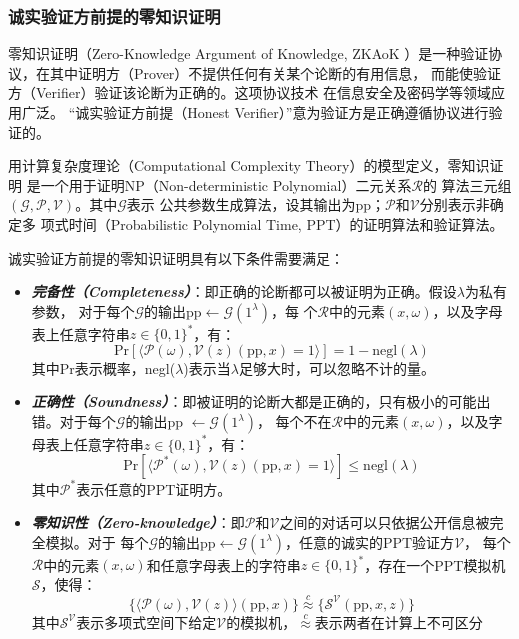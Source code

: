 \documentclass[zihao=-4]{ctexart}
\begin{document}
\begin{spacing}{1.5}
\subsubsection{诚实验证方前提的零知识证明}
零知识证明（Zero-Knowledge Argument of Knowledge, ZKAoK
）是一种验证协议，在其中证明方（Prover）不提供任何有关某个论断的有用信息，
而能使验证方（Verifier）验证该论断为正确的。这项协议技术
在信息安全及密码学等领域应用广泛。
“诚实验证方前提（Honest Verifier）”意为验证方是正确遵循协议进行验证的。\par
用计算复杂度理论（Computational Complexity Theory）的模型定义，零知识证明
是一个用于证明NP（Non-deterministic Polynomial）二元关系$\mathcal{R}$的
算法三元组$(\mathcal{G}, \mathcal{P}, \mathcal{V})$。其中$\mathcal{G}$表示
公共参数生成算法，设其输出为pp；$\mathcal{P}$和$\mathcal{V}$分别表示非确定多
项式时间（Probabilistic Polynomial Time, PPT）的证明算法和验证算法。\par
诚实验证方前提的零知识证明\cite{Fourty-two}具有以下条件需要满足：
\begin{itemize}
  \item \textbf{\emph{完备性（Completeness）}}：即正确的论断都可以被证明为正确。假设$\lambda$为私有参数，
      对于每个$\mathcal{G}$的输出pp$\leftarrow\mathcal{G}(1^{\lambda})$，每
      个$\mathcal{R}$中的元素$(x,\omega)$，以及字母表上任意字符串$z\in\{0,1\}^*$，有：
      \[\text{Pr}[\langle \mathcal{P}({\omega}),\mathcal{V}(z)(\text{pp},x)=1\rangle]=1-\text{negl}(\lambda)\]
      其中Pr表示概率，negl($\lambda$)表示当$\lambda$足够大时，可以忽略不计的量。
  \item \textbf{\emph{正确性（Soundness）}}：即被证明的论断大都是正确的，只有极小的可能出错。对于每个$\mathcal{G}$的输出pp
      $\leftarrow\mathcal{G}(1^{\lambda})$，
      每个不在$\mathcal{R}$中的元素$(x,\omega)$，以及字母表上任意字符串$z\in\{0,1\}^*$，有：
      \[\text{Pr}[\langle \mathcal{P}^*({\omega}),\mathcal{V}(z)(\text{pp},x)=1\rangle]\le\text{negl}(\lambda)\]
      其中$\mathcal{P}^*$表示任意的PPT证明方。
  \item \textbf{\emph{零知识性（Zero-knowledge）}}：即$\mathcal{P}$和$\mathcal{V}$之间的对话可以只依据公开信息被完全模拟。对于
      每个$\mathcal{G}$的输出pp$\leftarrow\mathcal{G}(1^{\lambda})$，任意的诚实的PPT验证方$\mathcal{V}$，
      每个$\mathcal{R}$中的元素$(x,\omega)$和任意字母表上的字符串$z\in\{0,1\}^*$，存在一个PPT模拟机$\mathcal{S}$，使得：
      \[\{\langle \mathcal{P}(\omega),\mathcal{V}(z)\rangle(\text{pp},x)\}\overset{c}{\approx}\{\mathcal{S}^{\mathcal{V}}(\text{pp},x,z)\}\]
      其中$\mathcal{S}^{\mathcal{V}}$表示多项式空间下给定$\mathcal{V}$的模拟机，$\overset{c}{\approx}$表示两者在计算上不可区分

\end{itemize}
\end{spacing}
\end{document}
